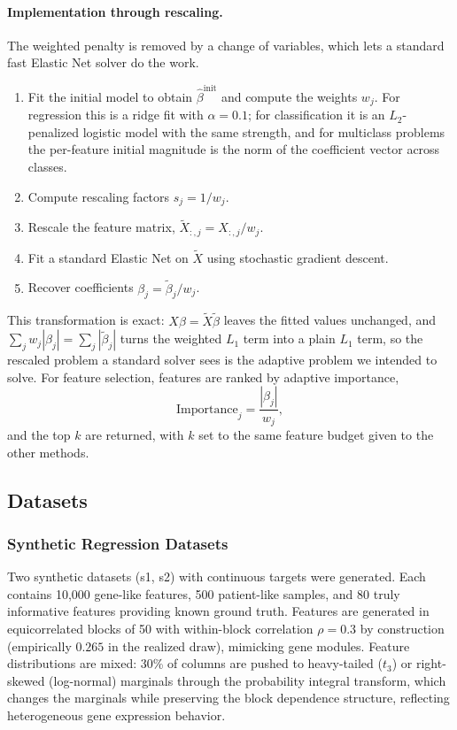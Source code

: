 \documentclass[11pt]{article}
\begin{document}
\paragraph{Implementation through rescaling.} The weighted penalty is removed by a change of
variables, which lets a standard fast Elastic Net solver do the work.
\begin{enumerate}
\item Fit the initial model to obtain $\hat{\beta}^{\mathrm{init}}$ and compute the weights $w_j$.
For regression this is a ridge fit with $\alpha = 0.1$; for classification it is an
$L_2$-penalized logistic model with the same strength, and for multiclass problems the per-feature
initial magnitude is the norm of the coefficient vector across classes.
\item Compute rescaling factors $s_j = 1/w_j$.
\item Rescale the feature matrix, $\tilde{X}_{:,j} = X_{:,j} / w_j$.
\item Fit a standard Elastic Net on $\tilde{X}$ using stochastic gradient descent.
\item Recover coefficients $\beta_j = \tilde{\beta}_j / w_j$.
\end{enumerate}
This transformation is exact: $X\beta = \tilde{X}\tilde{\beta}$ leaves the fitted values unchanged,
and $\sum_j w_j |\beta_j| = \sum_j |\tilde{\beta}_j|$ turns the weighted $L_1$ term into a plain
$L_1$ term, so the rescaled problem a standard solver sees is the adaptive problem we intended to
solve. For feature selection, features are ranked by adaptive importance,
\begin{equation}
\mathrm{Importance}_j = \frac{|\beta_j|}{w_j},
\end{equation}
and the top $k$ are returned, with $k$ set to the same feature budget given to the other methods.

\subsection{Datasets}

\subsubsection{Synthetic Regression Datasets}

Two synthetic datasets (s1, s2) with continuous targets were generated. Each contains 10{,}000
gene-like features, 500 patient-like samples, and 80 truly informative features providing known
ground truth. Features are generated in equicorrelated blocks of 50 with within-block correlation
$\rho = 0.3$ by construction (empirically $0.265$ in the realized draw), mimicking gene modules.
Feature distributions are mixed: 30\% of columns are pushed to heavy-tailed ($t_3$) or right-skewed
(log-normal) marginals through the probability integral transform, which changes the marginals while
preserving the block dependence structure, reflecting heterogeneous gene expression behavior.
\end{document}
